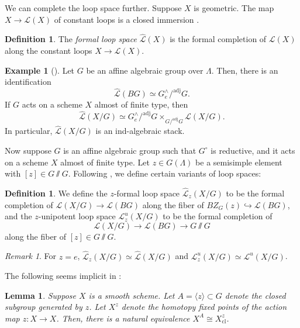 \documentclass{amsart}
\newtheorem{lemma}[theorem]{Lemma}
\theoremstyle{definition}
\newtheorem{definition}[theorem]{Definition}
\newtheorem{example}[theorem]{Example}
\theoremstyle{remark}
\newtheorem{remark}[theorem]{Remark}
\numberwithin{equation}{section}
\newcommand{\mc}{\mathcal}
\newcommand{\wh}{\widehat}
\newcommand{\cl}{\mathrm{cl}}
\newcommand{\adj}{\mathrm{adj}}
\begin{document}
We can complete the loop space further. Suppose $X$ is geometric. The map $X\to \mc L(X)$ of constant loops is a closed immersion \cite[Lemma 2.1.13]{Chenequivariant}.

\begin{definition}
The \emph{formal loop space} $\wh{\mc L}(X)$ is the formal completion of $\mc L(X)$ along the constant loops $X\to \mc L(X)$. 
\end{definition}

\begin{example}[{\cite[Example 2.1.21]{Chenequivariant}}]
Let $G$ be an affine algebraic group over $\Lambda$. Then, there is an identification
\[
\wh{\mc L} (BG) \simeq G^\wedge_e/^\adj G.  
\]
If $G$ acts on a scheme $X$ almost of finite type, then
\[
\wh{\mc L} (X/G) \simeq G^\wedge_e/^\adj G\times_{G/^\adj G}\mc L(X/G). 
\]
In particular, $\wh{\mc L} (X/G)$ is an ind-algebraic stack.  
\end{example}

Now suppose $G$ is an affine algebraic group such that $G^\circ$ is reductive, and it acts on a scheme $X$ almost of finite type. Let $z\in G(\Lambda)$ be a semisimple element with $[z]\in G\sslash G$. Following \cite{Chenequivariant, BCHNconstructible}, we define certain variants of loop spaces: 

\begin{definition}
We define the $z$-formal loop space $\wh{\mc L}_z (X/G)$ to be the formal completion of $\mc L(X/G)\to \mc L(BG)$ along the fiber of $BZ_G (z)\hookrightarrow\mc L(BG)$, and the $z$-unipotent loop space $\mc L^u_z(X/G)$ to be the formal completion of 
\[
\mc L (X/G)\to \mc L(BG)\to G\sslash G
\]
along the fiber of $[z]\in G\sslash G$. 
\end{definition}

\begin{remark}
For $z=e$, $\wh{\mc L}_z (X/G)\simeq \wh{\mc L}(X/G)$ and $\mc{L}^u_z (X/G)\simeq \mc L^u (X/G)$. 
\end{remark}

The following seems implicit in \cite{BCHNconstructible}:

\begin{lemma}
Suppose $X$ is a smooth scheme. Let $A=\langle z\rangle \subset G$ denote the closed subgroup generated by $z$. Let $X^z$ denote the homotopy fixed points of the action map $z\colon X\to X$. Then, there is a natural equivalence $X^A\cong X^z_{\cl}$. 
\end{lemma}
\end{document}

